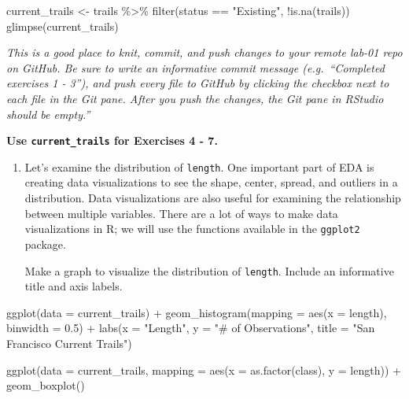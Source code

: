 \documentclass[
]{article}
\newenvironment{Shaded}{\begin{snugshade}}{\end{snugshade}}
\newcommand{\AttributeTok}[1]{\textcolor[rgb]{0.77,0.63,0.00}{#1}}
\newcommand{\FloatTok}[1]{\textcolor[rgb]{0.00,0.00,0.81}{#1}}
\newcommand{\FunctionTok}[1]{\textcolor[rgb]{0.00,0.00,0.00}{#1}}
\newcommand{\NormalTok}[1]{#1}
\newcommand{\OtherTok}[1]{\textcolor[rgb]{0.56,0.35,0.01}{#1}}
\newcommand{\SpecialCharTok}[1]{\textcolor[rgb]{0.00,0.00,0.00}{#1}}
\newcommand{\StringTok}[1]{\textcolor[rgb]{0.31,0.60,0.02}{#1}}
\begin{document}
\begin{Shaded}
\begin{Highlighting}[]
\NormalTok{current\_trails }\OtherTok{\textless{}{-}}\NormalTok{ trails }\SpecialCharTok{\%\textgreater{}\%}
  \FunctionTok{filter}\NormalTok{(status }\SpecialCharTok{==} \StringTok{"Existing"}\NormalTok{, }\SpecialCharTok{!}\FunctionTok{is.na}\NormalTok{(trails))}
\FunctionTok{glimpse}\NormalTok{(current\_trails)}
\end{Highlighting}
\end{Shaded}

\emph{This is a good place to knit, commit, and push changes to your
remote lab-01 repo on GitHub. Be sure to write an informative commit
message (e.g.~``Completed exercises 1 - 3''), and push every file to
GitHub by clicking the checkbox next to each file in the Git pane. After
you push the changes, the Git pane in RStudio should be empty.''}

\textbf{Use \texttt{current\_trails} for Exercises 4 - 7.}

\begin{enumerate}
\def\labelenumi{\arabic{enumi}.}
\setcounter{enumi}{3}
\item
  Let's examine the distribution of \texttt{length}. One important part
  of EDA is creating data visualizations to see the shape, center,
  spread, and outliers in a distribution. Data visualizations are also
  useful for examining the relationship between multiple variables.
  There are a lot of ways to make data visualizations in R; we will use
  the functions available in the \texttt{ggplot2} package.

  Make a graph to visualize the distribution of \texttt{length}. Include
  an informative title and axis labels.
\end{enumerate}

\begin{Shaded}
\begin{Highlighting}[]
\FunctionTok{ggplot}\NormalTok{(}\AttributeTok{data =}\NormalTok{ current\_trails) }\SpecialCharTok{+}
  \FunctionTok{geom\_histogram}\NormalTok{(}\AttributeTok{mapping =} \FunctionTok{aes}\NormalTok{(}\AttributeTok{x =}\NormalTok{ length), }\AttributeTok{binwidth =} \FloatTok{0.5}\NormalTok{) }\SpecialCharTok{+} 
  \FunctionTok{labs}\NormalTok{(}\AttributeTok{x =} \StringTok{"Length"}\NormalTok{, }
       \AttributeTok{y =} \StringTok{"\# of Observations"}\NormalTok{, }
       \AttributeTok{title =} \StringTok{"San Francisco Current Trails"}\NormalTok{)}

\FunctionTok{ggplot}\NormalTok{(}\AttributeTok{data =}\NormalTok{ current\_trails, }\AttributeTok{mapping =} \FunctionTok{aes}\NormalTok{(}\AttributeTok{x =} \FunctionTok{as.factor}\NormalTok{(class), }\AttributeTok{y =}\NormalTok{ length)) }\SpecialCharTok{+}
  \FunctionTok{geom\_boxplot}\NormalTok{()}
\end{Highlighting}
\end{Shaded}
\end{document}
